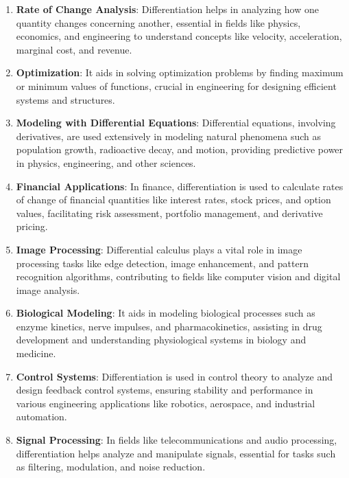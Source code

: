 \begin{enumerate}
    \item \textbf{Rate of Change Analysis}: Differentiation helps in analyzing how one quantity changes concerning another, essential in fields like physics, economics, and engineering to understand concepts like velocity, acceleration, marginal cost, and revenue.
    
    \item \textbf{Optimization}: It aids in solving optimization problems by finding maximum or minimum values of functions, crucial in engineering for designing efficient systems and structures.
    
    \item \textbf{Modeling with Differential Equations}: Differential equations, involving derivatives, are used extensively in modeling natural phenomena such as population growth, radioactive decay, and motion, providing predictive power in physics, engineering, and other sciences.
    
    \item \textbf{Financial Applications}: In finance, differentiation is used to calculate rates of change of financial quantities like interest rates, stock prices, and option values, facilitating risk assessment, portfolio management, and derivative pricing.
    
    \item \textbf{Image Processing}: Differential calculus plays a vital role in image processing tasks like edge detection, image enhancement, and pattern recognition algorithms, contributing to fields like computer vision and digital image analysis.
    
    \item \textbf{Biological Modeling}: It aids in modeling biological processes such as enzyme kinetics, nerve impulses, and pharmacokinetics, assisting in drug development and understanding physiological systems in biology and medicine.
    
    \item \textbf{Control Systems}: Differentiation is used in control theory to analyze and design feedback control systems, ensuring stability and performance in various engineering applications like robotics, aerospace, and industrial automation.
    
    \item \textbf{Signal Processing}: In fields like telecommunications and audio processing, differentiation helps analyze and manipulate signals, essential for tasks such as filtering, modulation, and noise reduction.
    

\end{enumerate}
